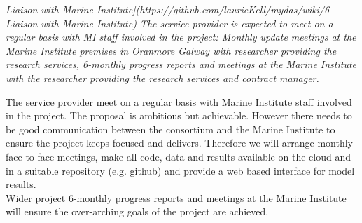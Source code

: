 
\textit{Liaison with Marine Institute](https://github.com/laurieKell/mydas/wiki/6-Liaison-with-Marine-Institute)
The service provider is expected to meet on a regular basis with MI staff involved in the project:
Monthly update meetings at the Marine Institute premises in Oranmore Galway with researcher providing the research services, 
6-monthly progress reports and meetings at the Marine Institute with the researcher providing the research services and contract manager.}

The service provider meet on a regular basis with Marine Institute staff involved in the project. 
The proposal is ambitious but achievable. However there needs to be good communication between the consortium and the Marine Institute to ensure the project keeps focused and delivers. Therefore we will arrange monthly face-to-face meetings, make all code, data and results available on the cloud and in a suitable repository (e.g. github) and provide a web based interface for model results.\\
Wider project 6-monthly progress reports and meetings at the Marine Institute will ensure the over-arching goals of the project are achieved.
